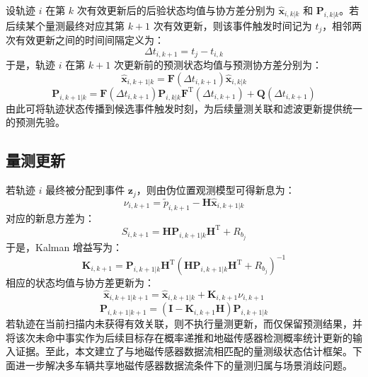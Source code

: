 \documentclass{xdupgthesis}
\begin{document}
设轨迹 $i$ 在第 $k$ 次有效更新后的后验状态均值与协方差分别为 $\hat{\mathbf x}_{i,k|k}$ 和 $\mathbf P_{i,k|k}$。若后续某个量测最终对应其第 $k+1$ 次有效更新，则该事件触发时间记为 $t_j$，相邻两次有效更新之间的时间间隔定义为：
\begin{equation}
	\Delta t_{i,k+1}=t_j-t_{i,k}
	\label{eq:ch3_dt_update}
\end{equation}
于是，轨迹 $i$ 在第 $k+1$ 次更新前的预测状态均值与预测协方差分别为：
\begin{equation}
	\hat{\mathbf x}_{i,k+1|k}
	=
	\mathbf F\left(\Delta t_{i,k+1}\right)\hat{\mathbf x}_{i,k|k}
	\label{eq:ch3_predict_state}
\end{equation}
\begin{equation}
	\mathbf P_{i,k+1|k}
	=
	\mathbf F\left(\Delta t_{i,k+1}\right)
	\mathbf P_{i,k|k}
	\mathbf F^{\mathrm T}\left(\Delta t_{i,k+1}\right)
	+
	\mathbf Q\left(\Delta t_{i,k+1}\right)
	\label{eq:ch3_predict_cov}
\end{equation}
由此可将轨迹状态传播到候选事件触发时刻，为后续量测关联和滤波更新提供统一的预测先验。

\subsection{量测更新}

若轨迹 $i$ 最终被分配到事件 $\mathbf z_j$，则由伪位置观测模型可得新息为：
\begin{equation}
	\nu_{i,k+1}=\tilde p_{i,k+1}-\mathbf H\hat{\mathbf x}_{i,k+1|k}
	\label{eq:ch3_innovation_event}
\end{equation}
对应的新息方差为：
\begin{equation}
	S_{i,k+1}=\mathbf H\mathbf P_{i,k+1|k}\mathbf H^{\mathrm T}+R_{b_j}
	\label{eq:ch3_S_event}
\end{equation}
于是，Kalman 增益写为：
\begin{equation}
	\mathbf K_{i,k+1}
	=
	\mathbf P_{i,k+1|k}\mathbf H^{\mathrm T}
	\left(
	\mathbf H\mathbf P_{i,k+1|k}\mathbf H^{\mathrm T}+R_{b_j}
	\right)^{-1}
	\label{eq:ch3_K_event}
\end{equation}
相应的状态均值与协方差更新为：
\begin{equation}
	\hat{\mathbf x}_{i,k+1|k+1}
	=
	\hat{\mathbf x}_{i,k+1|k}
	+
	\mathbf K_{i,k+1}\nu_{i,k+1}
	\label{eq:ch3_update_state_event}
\end{equation}
\begin{equation}
	\mathbf P_{i,k+1|k+1}
	=
	\left(\mathbf I-\mathbf K_{i,k+1}\mathbf H\right)\mathbf P_{i,k+1|k}
	\label{eq:ch3_update_cov_event}
\end{equation}
若轨迹在当前扫描内未获得有效关联，则不执行量测更新，而仅保留预测结果，并将该次未命中事实作为后续目标存在概率递推和地磁传感器检测概率统计更新的输入证据。至此，本文建立了与地磁传感器数据流相匹配的量测级状态估计框架。下面进一步解决多车辆共享地磁传感器数据流条件下的量测归属与场景消歧问题。
\end{document}
